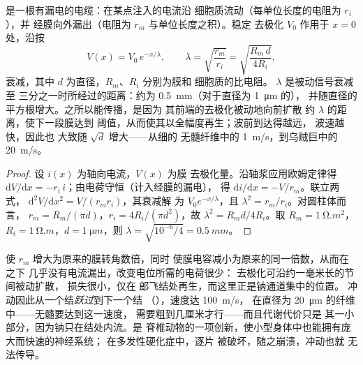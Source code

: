 \begin{theorem}[电缆与长度常数]\label{thm:b2:neurons-synapses:cable}
是一根有漏电的电缆：在某点注入的电流沿
细胞质流动（每单位长度的电阻为 $r_i$），并
经膜向外漏出（电阻为 $r_m$ 与单位长度之积）。稳定
去极化 $V_0$ 作用于 $x = 0$ 处，沿按
\[
V(x) = V_0\,e^{-x/\lambda}, \qquad \lambda = \sqrt{\frac{r_m}{r_i}} = \sqrt{\frac{R_m\,d}{4R_i}},
\]
衰减，其中 $d$ 为直径，$R_m$、$R_i$ 分别为膜和
细胞质的比电阻。\emph{}
$\lambda$ 是被动信号衰减至
三分之一时所经过的距离：约为 \qty{0.5}{mm}（对于直径为 \qty{1}{\micro m} 的），
并随直径的平方根增大。之所以能传播，是因为
其前端的去极化被动地向前扩散
约 $\lambda$ 的距离，使下一段膜达到
阈值，从而使其以全幅度再生；波前到达得越远，
波速越快，因此也
大致随 $\sqrt{d}$ 增大——从细的
无髓纤维中的 \qty{1}{m/s}，到乌贼巨中的 \qty{20}{m/s}。
\end{theorem}
\begin{proof}
设 $i(x)$ 为轴向电流，$V(x)$ 为膜
去极化量。沿轴浆应用欧姆定律得 $\mathrm{d}V/
\mathrm{d}x = -r_i\,i$；由电荷守恒（计入经膜的漏电），
得 $\mathrm{d}i/\mathrm{d}x = -V/r_m$。联立两式，
$\mathrm{d}^{2}V/\mathrm{d}x^{2} = V/(r_m r_i)$，其衰减解
为 $V_0 e^{-x/\lambda}$，且 $\lambda^{2} = r_m/r_i$。对圆柱体而言，
$r_m = R_m/(\pi d)$，$r_i = 4R_i/(\pi d^{2})$，故
$\lambda^{2} = R_m d/4R_i$。取 $R_m = \qty{1}{\ohm.m^2}$，$R_i =
\qty{1}{\ohm.m}$，$d = \qty{1}{\micro m}$，则 $\lambda = \sqrt{10^{-6}
/4} = \qty{0.5}{mm}$。
\end{proof}

\begin{proposition}[髓鞘与跳跃式传导]\label{prop:b2:neurons-synapses:myelin}
使 $r_m$ 增大为原来的膜转角数倍，同时
使膜电容减小为原来的同一倍数，从而在之下
几乎没有电流漏出，改变电位所需的电荷很少：
去极化可沿约一毫米长的节间被动扩散，
损失很小，仅在
郎飞结处再生，而这里正是钠通道集中的位置。
冲动因此从一个结\emph{跃过}到下一个结
（\emph{}），速度达 \qty{100}{m/s}，
在直径为 \qty{20}{\micro m} 的纤维中——无髓要达到这一速度，
需要粗到几厘米才行——而且代谢代价只是
其一小部分，因为钠只在结处内流。是
脊椎动物的一项创新，使小型身体中也能拥有庞大而快速的神经系统；
在多发性硬化症中，逐片
被破坏，随之崩溃，冲动也就
无法传导。
\end{proposition}


